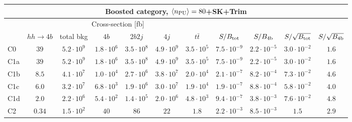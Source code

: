  \begin{tabular}{|l|cc|cccc|cccc|}
  \hline
\multicolumn{11}{|c|}{Boosted category, $\left\langle n_{\rm PU}\right\rangle=80$+SK+Trim}\\
\hline
&  \multicolumn{6}{c|}{Cross-section [fb]} &  &  & &  \\
   &  $hh\to 4b$ &  total bkg  &   $4b$    &  $2b2j$   &   $4j$    &
$t\bar{t}$ &
$S/B_{\rm tot}$ & $S/B_{\rm 4b}$ & $S/\sqrt{B_{\rm tot}}$ & $S/\sqrt{B_{\rm 4b}}$ \\
  \hline
  \hline
C0      &  $39$  &   $5.2 \cdot 10^9$   & $1.8 \cdot 10^6$ & $3.5 \cdot 10^8$ & $4.9 \cdot 10^9$ &  $3.5 \cdot 10^5$     &    $7.5 \cdot 10^{-9}$   & $2.2 \cdot 10^{-5}$  &   $3.0 \cdot 10^{-2}$   & $1.6 $ \\
 C1a     & $39$  &   $5.2 \cdot 10^9 $  & $1.8 \cdot 10^6$ & $3.5 \cdot 10^8$ & $4.9 \cdot 10^9$ & $3.5 \cdot 10^5  $   &    $7.5 \cdot 10^{-9}$   & $2.2 \cdot 10^{-5}$ &   $3.0 \cdot 10^{-2}$   & $1.6 $  \\
 C1b     &  $8.5 $  &   $4.1 \cdot 10^7$   & $1.0 \cdot 10^4$ & $2.7 \cdot 10^6$ & $3.8 \cdot 10^7$ & $2.0 \cdot 10^4 $    &   $2.1 \cdot 10^{-7}$   & $8.2 \cdot 10^{-4}$  &  $7.3 \cdot 10^{-2}$   & $4.6 $ \\
 C1c     & $6.0 $  &   $3.2 \cdot 10^7$   & $6.8 \cdot 10^3$ & $1.9 \cdot 10^6$ & $3.0 \cdot 10^7$ & $1.9 \cdot 10^4  $   &   $1.9 \cdot 10^{-7}$   & $8.8 \cdot 10^{-4}$ &    $5.8 \cdot 10^{-2}$   & $4.0 $ \\
 C1d     & $2.0 $ &   $2.2 \cdot 10^6$   & $5.4 \cdot 10^2$ & $1.4 \cdot 10^5$ & $2.0 \cdot 10^6$ & $4.8 \cdot 10^3   $  &   $9.4 \cdot 10^{-7}$   & $3.8 \cdot 10^{-3}$ & $7.6 \cdot 10^{-2}$   & $4.8 $ \\
 C2      & $0.34$  &   $1.5 \cdot 10^2$   & $40$ & $86$ & $22$ & $1.8 $     &   $ 2.2 \cdot 10^{-3}$   & $8.5 \cdot 10^{-3}$ &   $1.5 $   & $2.9 $ \\
\hline
\end{tabular}
 
